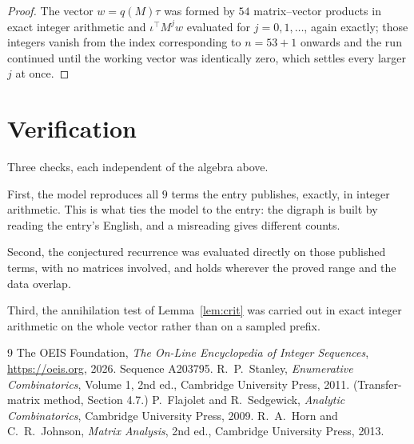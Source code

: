 \documentclass[11pt,a4paper]{article}
\theoremstyle{plain}
\theoremstyle{definition}
\begin{document}
\begin{proof}
The vector $w=q(M)\tau$ was formed by $54$ matrix--vector products in exact integer
arithmetic and $\iota^{\!\top}M^{j}w$ evaluated for $j=0,1,\dots$, again exactly; those
integers vanish from the index corresponding to $n=53+1$ onwards and the run continued
until the working vector was identically zero, which settles every larger $j$ at once.
\end{proof}

\section{Verification}

Three checks, each independent of the algebra above.

First, the model reproduces all $9$ terms the entry publishes, exactly, in integer
arithmetic. This is what ties the model to the entry: the digraph is built by reading the
entry's English, and a misreading gives different counts.

Second, the conjectured recurrence was evaluated directly on those published terms, with no
matrices involved, and holds wherever the proved range and the data overlap.

Third, the annihilation test of Lemma~\ref{lem:crit} was carried out in exact integer
arithmetic on the whole vector rather than on a sampled prefix.

\begin{thebibliography}{9}
 The OEIS Foundation, \emph{The On-Line Encyclopedia of Integer
Sequences}, \url{https://oeis.org}, 2026. Sequence A203795.
 R.~P.~Stanley, \emph{Enumerative Combinatorics}, Volume 1, 2nd ed.,
Cambridge University Press, 2011. (Transfer-matrix method, Section 4.7.)
 P.~Flajolet and R.~Sedgewick, \emph{Analytic Combinatorics}, Cambridge
University Press, 2009.
 R.~A.~Horn and C.~R.~Johnson, \emph{Matrix Analysis}, 2nd ed., Cambridge
University Press, 2013.
\end{thebibliography}
\end{document}
